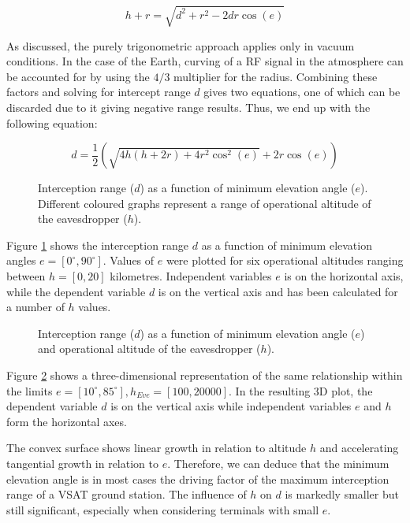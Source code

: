 \documentclass[english, 12pt, a4paper, elec, utf8, a-1b, online]{aaltothesis}
\begin{document}
\begin{equation} \label{eq-range-3}
  h + r = \sqrt{d^2 + r^2 - 2 d r \cos(e)}
\end{equation}

As discussed, the purely trigonometric approach applies only in vacuum conditions.
In the case of the Earth, curving of a RF signal in the atmosphere can be accounted for by using the $4/3$ multiplier for the radius.
Combining these factors and solving for intercept range $d$ gives two equations, one of which can be discarded due to it giving negative range results.
Thus, we end up with the following equation:

\begin{equation} \label{eq-range-4}
  d = \frac{1}{2} (\sqrt{4 h (h + 2 r) + 4 r^2 \cos^2(e)} + 2 r \cos(e))
\end{equation}

\begin{figure}[h]
  \centering
  
  \caption{Interception range ($d$) as a function of minimum elevation angle ($e$). Different coloured graphs represent a range of  operational altitude of the eavesdropper ($h$).}
  \label{fig-interception-range-2d}
\end{figure}

Figure \ref{fig-interception-range-2d} shows the interception range $d$ as a function of minimum elevation angles $e = [0^\circ, 90^\circ]$.
Values of $e$ were plotted for six operational altitudes ranging between $h = [0,20]$ kilometres.
Independent variables $e$ is on the horizontal axis, while the dependent variable $d$ is on the vertical axis and has been calculated for a number of $h$ values.

\begin{figure}[h]
  \centering
  
  \caption{Interception range ($d$) as a function of minimum elevation angle ($e$) and operational altitude of the eavesdropper ($h$).}
  \label{fig-interception-range-3d}
\end{figure}

Figure \ref{fig-interception-range-3d} shows a three-dimensional representation of the same relationship within the limits $e = [10^\circ, 85^\circ], h_{Eve} = [100,20000]$.
In the resulting 3D plot, the dependent variable $d$ is on the vertical axis while independent variables $e$ and $h$ form the horizontal axes.

The convex surface shows linear growth in relation to altitude $h$ and accelerating tangential growth in relation to $e$.
Therefore, we can deduce that the minimum elevation angle is in most cases the driving factor of the maximum interception range of a VSAT ground station.
The influence of $h$ on $d$ is markedly smaller but still significant, especially when considering terminals with small $e$.
\end{document}
